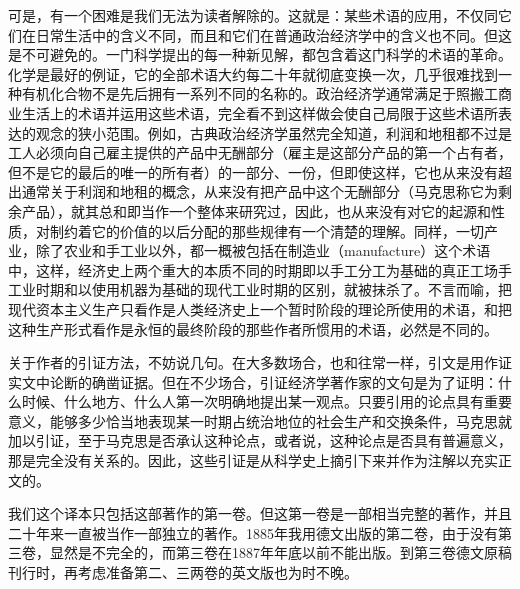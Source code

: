 \documentclass{ctexbook}
\begin{document}
可是，有一个困难是我们无法为读者解除的。这就是：某些术语的应用，不仅同它们在日常生活中的含义不同，而且和它们在普通政治经济学中的含义也不同。但这是不可避免的。一门科学提出的每一种新见解，都包含着这门科学的术语的革命。化学是最好的例证，它的全部术语大约每二十年就彻底变换一次，几乎很难找到一种有机化合物不是先后拥有一系列不同的名称的。政治经济学通常满足于照搬工商业生活上的术语并运用这些术语，完全看不到这样做会使自己局限于这些术语所表达的观念的狭小范围。例如，古典政治经济学虽然完全知道，利润和地租都不过是工人必须向自己雇主提供的产品中无酬部分（雇主是这部分产品的第一个占有者，但不是它的最后的唯一的所有者）的一部分、一份，但即使这样，它也从来没有超出通常关于利润和地租的概念，从来没有把产品中这个无酬部分（马克思称它为剩余产品），就其总和即当作一个整体来研究过，因此，也从来没有对它的起源和性质，对制约着它的价值的以后分配的那些规律有一个清楚的理解。同样，一切产业，除了农业和手工业以外，都一概被包括在制造业（manufacture）这个术语中，这样，经济史上两个重大的本质不同的时期即以手工分工为基础的真正工场手工业时期和以使用机器为基础的现代工业时期的区别，就被抹杀了。不言而喻，把现代资本主义生产只看作是人类经济史上一个暂时阶段的理论所使用的术语，和把这种生产形式看作是永恒的最终阶段的那些作者所惯用的术语，必然是不同的。

关于作者的引证方法，不妨说几句。在大多数场合，也和往常一样，引文是用作证实文中论断的确凿证据。但在不少场合，引证经济学著作家的文句是为了证明：什么时候、什么地方、什么人第一次明确地提出某一观点。只要引用的论点具有重要意义，能够多少恰当地表现某一时期占统治地位的社会生产和交换条件，马克思就加以引证，至于马克思是否承认这种论点，或者说，这种论点是否具有普遍意义，那是完全没有关系的。因此，这些引证是从科学史上摘引下来并作为注解以充实正文的。

我们这个译本只包括这部著作的第一卷。但这第一卷是一部相当完整的著作，并且二十年来一直被当作一部独立的著作。1885年我用德文出版的第二卷，由于没有第三卷，显然是不完全的，而第三卷在1887年年底以前不能出版。到第三卷德文原稿刊行时，再考虑准备第二、三两卷的英文版也为时不晚。
\end{document}
